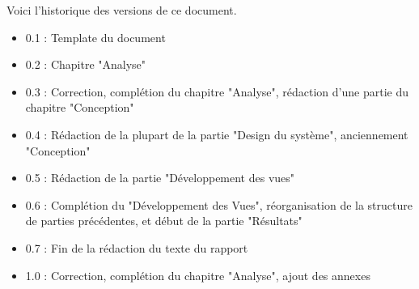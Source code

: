 Voici l’historique des versions de ce document.

\begin{itemize}
	\item 0.1 : Template du document
	\item 0.2 : Chapitre "Analyse"
	\item 0.3 : Correction, complétion du chapitre "Analyse", rédaction d'une partie du chapitre "Conception"
	\item 0.4 : Rédaction de la plupart de la partie "Design du système", anciennement "Conception"
	\item 0.5 : Rédaction de la partie "Développement des vues"
	\item 0.6 : Complétion du "Développement des Vues", réorganisation de la structure de parties précédentes, et début de la partie "Résultats"
	\item 0.7 : Fin de la rédaction du texte du rapport
	\item 1.0 : Correction, complétion du chapitre "Analyse", ajout des annexes
\end{itemize}